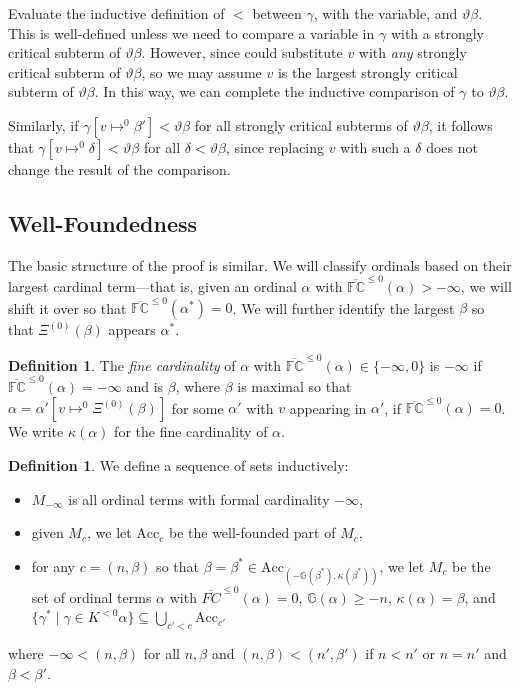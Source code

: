 \documentclass[11pt]{amsart}
\theoremstyle{definition}
\newtheorem{definition}[theorem]{Definition}
\begin{document}
Evaluate the inductive definition of $<$ between $\gamma$, with the variable, and $\vartheta\beta$. This is well-defined unless we need to compare a variable in $\gamma$ with a strongly critical subterm of $\vartheta\beta$. However, since could substitute $v$ with \emph{any} strongly critical subterm of $\vartheta\beta$, so we may assume $v$ is the largest strongly critical subterm of $\vartheta\beta$. In this way, we can complete the inductive comparison of $\gamma$ to $\vartheta\beta$.

Similarly, if $\gamma[v\mapsto^{0}\beta']<\vartheta\beta$ for all strongly critical subterms of $\vartheta\beta$, it follows that $\gamma[v\mapsto^{0}\delta]<\vartheta\beta$ for all $\delta<\vartheta\beta$, since replacing $v$ with such a $\delta$ does not change the result of the comparison.


\subsection{Well-Foundedness}

The basic structure of the proof is similar. We will classify ordinals based on their largest cardinal term---that is, given an ordinal $\alpha$ with $\overline{\mathbb{FC}}^{\leq 0}(\alpha)>-\infty$, we will shift it over so that $\overline{\mathbb{FC}}^{\leq 0}(\alpha^{*})=0$. We will further identify the largest $\beta$ so that $\Xi^{(0)}(\beta)$ appears $\alpha^*$.

\begin{definition}
  The \emph{fine cardinality} of $\alpha$ with $\overline{\mathbb{FC}}^{\leq 0}(\alpha)\in\{-\infty,0\}$ is $-\infty$ if $\overline{\mathbb{FC}}^{\leq 0}(\alpha)=-\infty$ and is $\beta$, where $\beta$ is maximal so that $\alpha=\alpha'[v\mapsto^0\Xi^{(0)}(\beta)]$ for some $\alpha'$ with $v$ appearing in $\alpha'$, if $\overline{\mathbb{FC}}^{\leq 0}(\alpha)=0$. We write $\kappa(\alpha)$ for the fine cardinality of $\alpha$.
\end{definition}

\begin{definition}
  We define a sequence of sets inductively:
  \begin{itemize}
  \item $M_{-\infty}$ is all ordinal terms with formal cardinality $-\infty$,
  \item given $M_c$, we let $\mathrm{Acc}_c$ be the well-founded part of $M_c$,
  \item for any $c=(n,\beta)$ so that $\beta=\beta^*\in\mathrm{Acc}_{(-\mathbb{G}(\beta^*),\kappa(\beta^*))}$, we let $M_c$ be the set of ordinal terms $\alpha$ with $\overline{FC}^{\leq 0}(\alpha)=0$, $\mathbb{G}(\alpha)\geq -n$, $\kappa(\alpha)=\beta$, and $\{\gamma^*\mid \gamma\in K^{<0}\alpha\}\subseteq\bigcup_{c'<c}\mathrm{Acc}_{c'}$
  \end{itemize}
  where $-\infty<(n,\beta)$ for all $n,\beta$ and $(n,\beta)<(n',\beta')$ if $n<n'$ or $n=n'$ and $\beta<\beta'$.
\end{definition}
\end{document}
